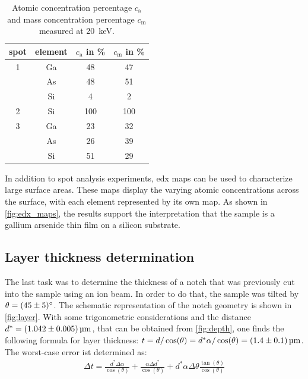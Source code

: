 \begin{table}
	\centering
	\begin{tabular}{cccc}
		\toprule
		spot & element & $c_\mathrm{a}$ in \unit{\percent } & $c_\mathrm{m}$ in \unit{\percent} \\
		\midrule
		1    & Ga      & 48                                 & 47                                \\
		     & As      & 48                                 & 51                                \\
		     & Si      & 4                                  & 2                                 \\
		\midrule
		2    & Si      & 100                                & 100                               \\
		\midrule
		3    & Ga      & 23                                 & 32                                \\
		     & As      & 26                                 & 39                                \\
		     & Si      & 51                                 & 29                                \\
		\bottomrule
	\end{tabular}
	\caption{Atomic concentration percentage $c_\mathrm{a}$ and mass
		concentration percentage $c_\mathrm{m}$ measured at
		\qty{20}{\kilo\electronvolt}.}
	\label{tab:edx_2}
\end{table}

In addition to spot analysis experiments, \ac{edx} maps can be used to
characterize large surface areas.
These maps display the varying atomic concentrations across the
surface, with each element represented by its own map.
As shown in \cref{fig:edx_maps}, the results support the
interpretation that the sample is a gallium arsenide thin film
on a silicon substrate.

\subsection{Layer thickness determination}
The last task was to determine the thickness of a notch that was
previously cut into the sample using an ion beam.
In order to do that, the sample was tilted by $\theta=\qty{45 \pm 5}{\degree}$.
The schematic representation of the notch geometry is shown
in \cref{fig:layer}.
With some trigonometric considerations and the distance
$d^*=\qty{1.042 \pm 0.005}{\micro\meter}$, that can be obtained from
\cref{fig:depth},
one finds the following formula for layer thickness:
$t = d / \cos(\theta) = d^* \alpha / \cos(\theta)
	= \qty{1.4\pm 0.1}{\micro\meter}$.
The worst-case error ist determined as:
\begin{align}
	\Delta t=\frac{d^{*}\Delta\alpha}{\cos(\theta)}
	+\frac{\alpha\Delta d^{*}}{\cos( \theta)}
	+d^{*}\alpha\Delta\theta \frac{\tan(\theta)}{\cos(\theta)}
\end{align}




